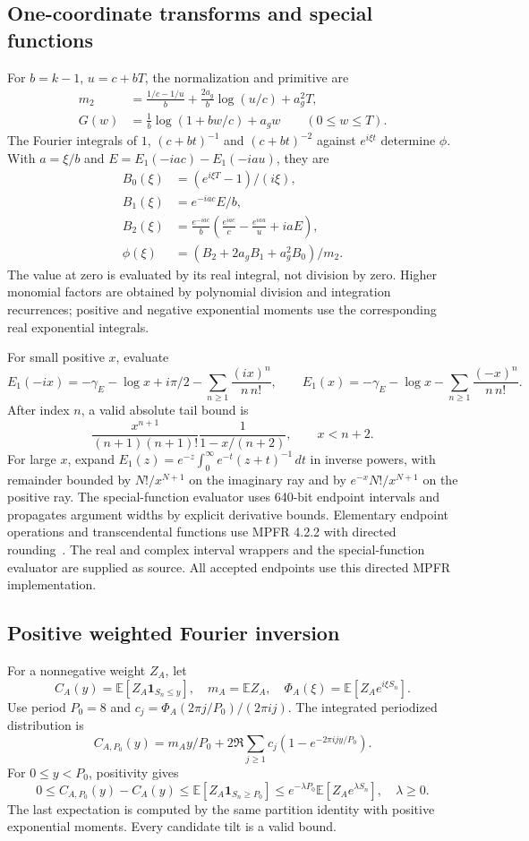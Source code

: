 \documentclass[11pt,a4paper]{article}
\theoremstyle{definition}\newtheorem{definition}[theorem]{Definition}
\theoremstyle{remark}\newtheorem{remark}[theorem]{Remark}
\newcommand{\E}{\mathbb E}\newcommand{\Prob}{\mathbb P}
\newcommand{\ind}{\mathbf 1}\newcommand{\dd}{\,d}
\numberwithin{equation}{section}
\begin{document}
\subsection{One-coordinate transforms and special functions}
For $b=k-1$, $u=c+bT$, the normalization and primitive are
\begin{align*}
 m_2&=\frac{1/c-1/u}{b}+\frac{2a_g}{b}\log(u/c)+a_g^2T,\\
 G(w)&=\frac1b\log(1+bw/c)+a_gw\qquad(0\le w\le T).
\end{align*}
The Fourier integrals of $1$, $(c+bt)^{-1}$ and $(c+bt)^{-2}$ against $e^{i\xi t}$ determine $\phi$. With $a=\xi/b$ and $E=E_1(-iac)-E_1(-iau)$, they are
\begin{align*}
 B_0(\xi)&=(e^{i\xi T}-1)/(i\xi),\\
 B_1(\xi)&=e^{-iac}E/b,\\
 B_2(\xi)&=\frac{e^{-iac}}b
 \left(\frac{e^{iac}}c-\frac{e^{iau}}u+iaE\right),\\
 \phi(\xi)&=(B_2+2a_gB_1+a_g^2B_0)/m_2.
\end{align*}
The value at zero is evaluated by its real integral, not division by zero. Higher monomial factors are obtained by polynomial division and integration recurrences; positive and negative exponential moments use the corresponding real exponential integrals.

For small positive $x$, evaluate
\[
 E_1(-ix)=-\gamma_E-\log x+i\pi/2-\sum_{n\ge1}\frac{(ix)^n}{n\,n!},\qquad
 E_1(x)=-\gamma_E-\log x-\sum_{n\ge1}\frac{(-x)^n}{n\,n!}.
\]
After index $n$, a valid absolute tail bound is
\[
 \frac{x^{n+1}}{(n+1)(n+1)!}\frac1{1-x/(n+2)},\qquad x<n+2.
\]
For large $x$, expand $E_1(z)=e^{-z}\int_0^\infty e^{-t}(z+t)^{-1}\dd t$ in inverse powers, with remainder bounded by $N!/x^{N+1}$ on the imaginary ray and by $e^{-x}N!/x^{N+1}$ on the positive ray. The special-function evaluator uses 640-bit endpoint intervals and propagates argument widths by explicit derivative bounds. Elementary endpoint operations and transcendental functions use MPFR 4.2.2 with directed rounding~\cite{mpfr}. The real and complex interval wrappers and the special-function evaluator are supplied as source. All accepted endpoints use this directed MPFR implementation.

\subsection{Positive weighted Fourier inversion}
For a nonnegative weight $Z_A$, let
\[
 C_A(y)=\E[Z_A\ind_{S_n\le y}],\quad m_A=\E Z_A,\quad
 \Phi_A(\xi)=\E[Z_Ae^{i\xi S_n}].
\]
Use period $P_0=8$ and $c_j=\Phi_A(2\pi j/P_0)/(2\pi i j)$. The integrated periodized distribution is
\begin{equation}\label{eq:periodcdf}
 C_{A,P_0}(y)=m_Ay/P_0+
 2\Re\sum_{j\ge1}c_j(1-e^{-2\pi ijy/P_0}).
\end{equation}
For $0\le y<P_0$, positivity gives
\[
 0\le C_{A,P_0}(y)-C_A(y)
 \le\E[Z_A\ind_{S_n\ge P_0}]
 \le e^{-\lambda P_0}\E[Z_Ae^{\lambda S_n}],\quad\lambda\ge0.
\]
The last expectation is computed by the same partition identity with positive exponential moments. Every candidate tilt is a valid bound.
\end{document}

